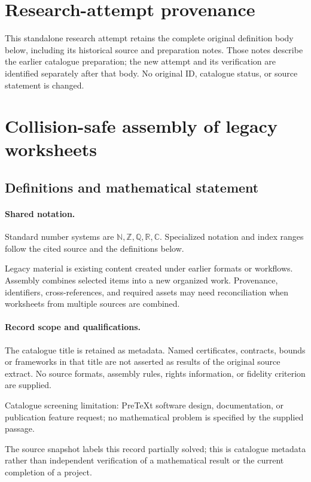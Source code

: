 \documentclass[11pt]{article}
\begin{document}
\section*{Research-attempt provenance}
This standalone research attempt retains the complete original definition body below,
including its historical source and preparation notes. Those notes describe the
earlier catalogue preparation; the new attempt and its verification are identified
separately after that body. No original ID, catalogue status, or source statement is changed.

\section{Collision-safe assembly of legacy worksheets}\label{statement}

\subsection{Definitions and mathematical statement}

\paragraph{Shared notation.}Standard number systems are $\mathbb N,\mathbb Z,\mathbb Q,\mathbb R,\mathbb C$. Specialized notation and index ranges follow the cited source and the definitions below.


Legacy material is existing content created under earlier formats or workflows. Assembly combines selected items into a new organized work. Provenance, identifiers, cross-references, and required assets may need reconciliation when worksheets from multiple sources are combined.
\paragraph{Record scope and qualifications.}
The catalogue title is retained as metadata. Named certificates, contracts, bounds or frameworks in that title are not asserted as results of the original source extract.
No source formats, assembly rules, rights information, or fidelity criterion are supplied.

Catalogue screening limitation: PreTeXt software design, documentation, or publication feature request; no mathematical problem is specified by the supplied passage.

The source snapshot labels this record partially solved; this is catalogue metadata rather than independent verification of a mathematical result or the current completion of a project.
\end{document}
